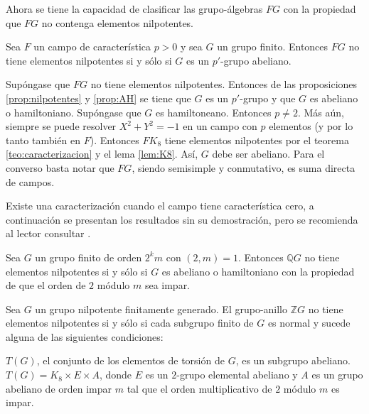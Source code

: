 Ahora se tiene la capacidad de clasificar las grupo-álgebras $FG$ con la propiedad que $FG$ no contenga elementos nilpotentes.
\begin{teorema}\label{teo:caracCarEntera}
Sea $F$ un campo de característica $p > 0$ y sea $G$ un grupo finito. Entonces $FG$ no tiene elementos nilpotentes si y sólo si $G$ es un $p'$-grupo abeliano. 
\end{teorema}
\begin{proof*}
Supóngase que $FG$ no tiene elementos nilpotentes. Entonces de las proposiciones \ref{prop:nilpotentes} y \ref{prop:AH} se tiene que $G$ es un $p'$-grupo y que $G$ es abeliano o hamiltoniano. Supóngase que $G$ es hamiltoneano. Entonces $p \neq 2$. Más aún, siempre se puede resolver $X^2 + Y^2 = -1$ en un campo con $p$ elementos (y por lo tanto también en $F$). Entonces $FK_8$ tiene elementos nilpotentes por el teorema \ref{teo:caracterizacion} y el lema \ref{lem:K8}. Así, $G$ debe ser abeliano.
Para el converso basta notar que $FG$, siendo semisimple y conmutativo, es suma directa de campos. 
\end{proof*}

Existe una caracterización cuando el campo tiene característica cero, a continuación se presentan los resultados sin su demostración, pero se recomienda al lector consultar \cite{bib:Sehgal}.
\begin{teorema}\label{teo:caracCar0}
Sea $G$ un grupo finito de orden $2^km$ con $(2,m) = 1$. Entonces $\mathds{Q}G$ no tiene elementos nilpotentes si y sólo si $G$ es abeliano o hamiltoniano con la propiedad de que el orden de $2$ módulo $m$ sea impar. 
\end{teorema}

\begin{teorema}
Sea $G$ un grupo nilpotente finitamente generado. El grupo-anillo $\mathds{Z}G$ no tiene elementos nilpotentes si y sólo si cada subgrupo finito de $G$ es normal y sucede alguna de las siguientes condiciones:
\begin{bulletList}
\newItem $T(G)$, el conjunto de los elementos de torsión de $G$, es un subgrupo abeliano.
\newItem $T(G) = K_8 \times E \times A$, donde $E$ es un $2$-grupo elemental abeliano y $A$ es un grupo abeliano de orden impar $m$ tal que el orden multiplicativo de $2$ módulo $m$ es impar.  
\end{bulletList}
\end{teorema}